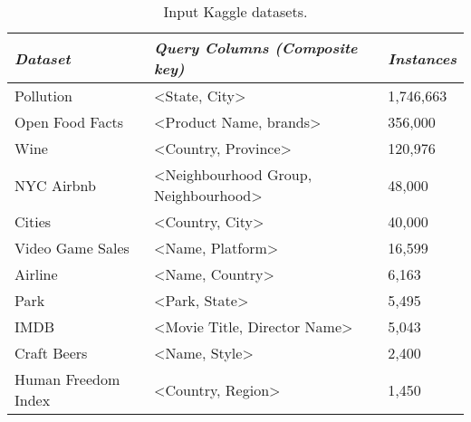 \begin{table}[]
    \scriptsize
    \centering
    \caption*{Input Kaggle datasets.}
    \label{tab:datasets}
\begin{tabular}{l|l|l}
\toprule
\textit{\textbf{Dataset}} & \textit{\textbf{Query Columns (Composite key)}} & \textit{\textbf{Instances}} \\ \toprule
Pollution~\cite{kaggle_pollution}             & <State, City>       & 1,746,663\\ \hline
Open Food Facts~\cite{kaggle_food}             & <Product Name, brands>   & 356,000\\\hline
Wine~\cite{kaggle_wine}             & <Country, Province>    & 120,976        \\\hline
NYC Airbnb~\cite{kaggle_airbnb}             & <Neighbourhood Group, Neighbourhood>    & 48,000\\\hline
Cities~\cite{base_Cities}             & <Country, City>    & 40,000       \\ \hline%
Video Game Sales~\cite{kaggle_vgsales}             & <Name, Platform>  & 16,599 \\\hline
Airline~\cite{kaggle_airline} & <Name, Country> & 6,163 \\\hline
Park~\cite{kaggle_park} & <Park, State> & 5,495 \\\hline
IMDB~\cite{base_imdb}& <Movie Title, Director Name> &  5,043  \\\hline
Craft Beers~\cite{kaggle_beer}             & <Name, Style>         & 2,400\\\hline
Human Freedom Index~\cite{kaggle_hfi}             & <Country, Region> & 1,450\\\hline
\end{tabular}
\end{table}